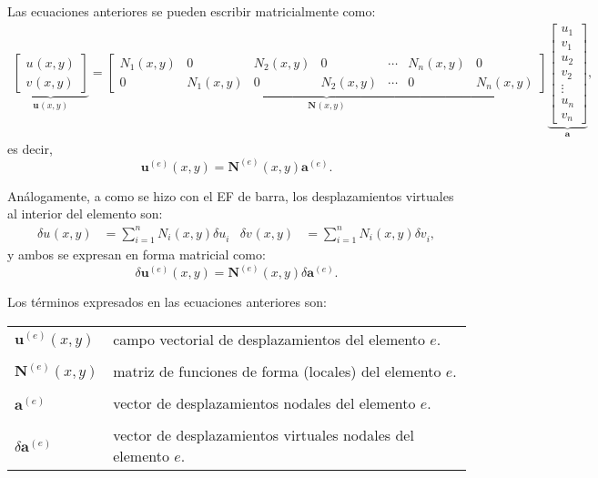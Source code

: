 \documentclass[12pt,letterpaper, landscape]{article}
\newcommand{\e}{{}}
\newcommand{\ve}[1]{{\boldsymbol{#1}}}
\newcommand{\ma}[1]{{\boldsymbol{#1}}}
\begin{document}
Las ecuaciones anteriores se pueden escribir matricialmente como:
\begin{align}
\underbrace{\begin{bmatrix}
u^\e(x,y) \\
v^\e(x,y)
\end{bmatrix}}_{\ve{u}^\e(x,y)}
=
\underbrace{\begin{bmatrix}
N_1^\e(x,y) & 0 & N_2^\e(x,y) & 0   & \cdots & N_n^\e(x,y) & 0\\
0 & N_1^\e(x,y) & 0 & N_2^\e(x,y)   & \cdots & 0 & N_n^\e(x,y) 
\end{bmatrix}}_{\ma{N}^\e(x,y)}
\underbrace{\begin{bmatrix}
   u_1^\e \\ v_1^\e \\ u_2^\e \\ v_2^\e \\ \vdots \\ u_n^\e \\ v_n^\e
\end{bmatrix}}_{\ma{a}^\e},
\end{align}
es decir,
\begin{equation}
\ve{u}^{(e)}(x,y) = \ma{N}^{(e)}(x,y)  \ve{a}^{(e)}.
\end{equation}


Análogamente, a como se hizo con el EF de barra, los desplazamientos virtuales al interior del elemento son:
\begin{align}
\delta u^\e(x,y) &= \sum_{i=1}^n N_i^\e(x,y) \delta u_i^\e &
\delta v^\e(x,y) &= \sum_{i=1}^n N_i^\e(x,y) \delta v_i^\e, 
\end{align}
y ambos se expresan en forma matricial como:
\begin{equation}
\delta \ve{u}^{(e)}(x,y) = \ma{N}^{(e)}(x,y)  \delta\ve{a}^{(e)}. \label{eq:delta_u}
\end{equation}

Los términos expresados en las ecuaciones anteriores son:

\begin{tabular}{ll}
$\ve{u}^{(e)}(x,y)$     & {campo vectorial de desplazamientos del elemento} $e$.\\
\\[-1ex]
$\ma{N}^{(e)}(x,y)$  & {matriz de funciones de forma (locales) del elemento} $e$.\\
\\[-1ex]
$\ve{a}^{(e)}$       & {vector de desplazamientos nodales del elemento} $e$. \\
\\[-1ex]
$\delta\ve{a}^{(e)}$ & {vector de desplazamientos virtuales nodales del elemento} $e$.
\end{tabular} 
\end{document}
